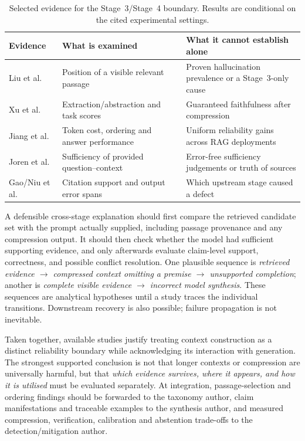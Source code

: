 \begin{table}[t]
\centering
\caption{Selected evidence for the Stage~3/Stage~4 boundary. Results are conditional on the cited experimental settings.}
\label{tab:section6-boundaries}
\scriptsize
\setlength{\tabcolsep}{3pt}
\begin{tabular}{@{}p{}p{}p{}@{}}
\toprule
Evidence & What is examined & What it cannot establish alone \\
\midrule
Liu et al.\ \cite{liu2024lost} & Position of a visible relevant passage & Proven hallucination prevalence or a Stage~3-only cause \\
Xu et al.\ \cite{xu2024recomp} & Extraction/abstraction and task scores & Guaranteed faithfulness after compression \\
Jiang et al.\ \cite{jiang2024longllmlingua} & Token cost, ordering and answer performance & Uniform reliability gains across RAG deployments \\
Joren et al.\ \cite{joren2025sufficient} & Sufficiency of provided question--context & Error-free sufficiency judgements or truth of sources \\
Gao/Niu et al.\ \cite{gao2023alce,niu2024ragtruth} & Citation support and output error spans & Which upstream stage caused a defect \\
\bottomrule
\end{tabular}
\end{table}

A defensible cross-stage explanation should first compare the retrieved candidate set with the prompt actually supplied, including passage provenance and any compression output. It should then check whether the model had sufficient supporting evidence, and only afterwards evaluate claim-level support, correctness, and possible conflict resolution. One plausible sequence is \emph{retrieved evidence $\rightarrow$ compressed context omitting a premise $\rightarrow$ unsupported completion}; another is \emph{complete visible evidence $\rightarrow$ incorrect model synthesis}. These sequences are analytical hypotheses until a study traces the individual transitions. Downstream recovery is also possible; failure propagation is not inevitable.

Taken together, available studies justify treating context construction as a distinct reliability boundary while acknowledging its interaction with generation. The strongest supported conclusion is not that longer contexts or compression are universally harmful, but that \emph{which evidence survives, where it appears, and how it is utilised} must be evaluated separately. At integration, passage-selection and ordering findings should be forwarded to the taxonomy author, claim manifestations and traceable examples to the synthesis author, and measured compression, verification, calibration and abstention trade-offs to the detection/mitigation author.